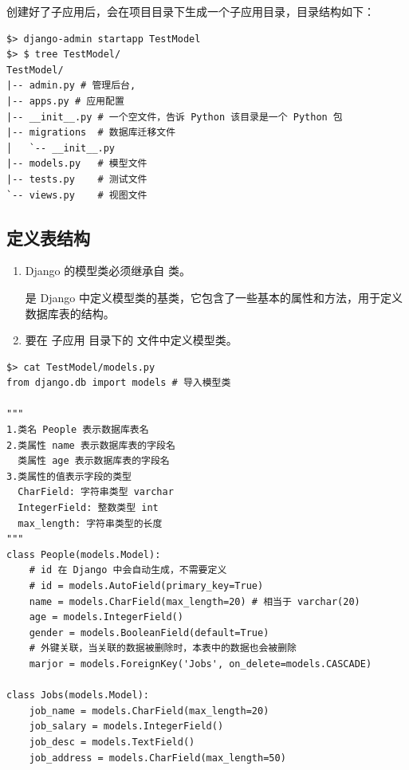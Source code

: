 创建好了子应用后，会在项目目录下生成一个子应用目录，目录结构如下：
\begin{lstlisting}[style=demostyle,numbers=none]
$> django-admin startapp TestModel
$> $ tree TestModel/
TestModel/
|-- admin.py # 管理后台,
|-- apps.py # 应用配置
|-- __init__.py # 一个空文件，告诉 Python 该目录是一个 Python 包
|-- migrations  # 数据库迁移文件
│   `-- __init__.py
|-- models.py   # 模型文件
|-- tests.py    # 测试文件
`-- views.py    # 视图文件
\end{lstlisting}

\subsection{定义表结构}
\begin{enumerate}[label=\arabic*)]
    \item Django 的模型类必须继承自  类。

     是 Django 中定义模型类的基类，它包含了一些基本的属性和方法，用于定义数据库表的结构。

    \item 要在 \textcolor{YBXPurple}{子应用} 目录下的  文件中定义模型类。
\end{enumerate}


\begin{lstlisting}[style=demostyle,numbers=none]
$> cat TestModel/models.py
from django.db import models # 导入模型类
 
"""
1.类名 People 表示数据库表名 
2.类属性 name 表示数据库表的字段名
  类属性 age 表示数据库表的字段名
3.类属性的值表示字段的类型
  CharField: 字符串类型 varchar
  IntegerField: 整数类型 int  
  max_length: 字符串类型的长度
"""
class People(models.Model):
    # id 在 Django 中会自动生成，不需要定义
    # id = models.AutoField(primary_key=True)
    name = models.CharField(max_length=20) # 相当于 varchar(20)
    age = models.IntegerField()
    gender = models.BooleanField(default=True)    
    # 外键关联，当关联的数据被删除时，本表中的数据也会被删除
    marjor = models.ForeignKey('Jobs', on_delete=models.CASCADE)

class Jobs(models.Model):
    job_name = models.CharField(max_length=20)
    job_salary = models.IntegerField()
    job_desc = models.TextField()
    job_address = models.CharField(max_length=50)
    
\end{lstlisting}

